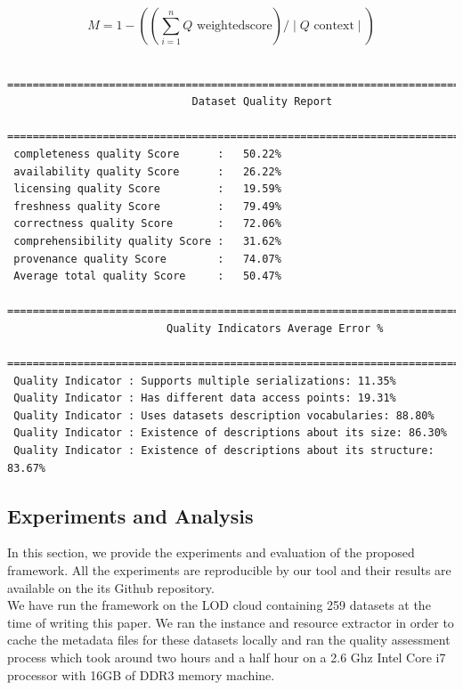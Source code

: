 \documentclass[onecolumn, crcready]{iosart2c}
\begin{document}
\begin{equation}
 M =  1 - ((\sum_{i=1}^{n} Q\textrm{ weightedscore}) / \mid Q\textrm{ context} \mid )
\end{equation}

\begin{lstlisting}
 =================================================================================
                             Dataset Quality Report
 =================================================================================
 completeness quality Score      :   50.22%
 availability quality Score      :   26.22%
 licensing quality Score         :   19.59%
 freshness quality Score         :   79.49%
 correctness quality Score       :   72.06%
 comprehensibility quality Score :   31.62%
 provenance quality Score        :   74.07%
 Average total quality Score     :   50.47%
 =================================================================================
                         Quality Indicators Average Error %
 =================================================================================
 Quality Indicator : Supports multiple serializations: 11.35%
 Quality Indicator : Has different data access points: 19.31%
 Quality Indicator : Uses datasets description vocabularies: 88.80%
 Quality Indicator : Existence of descriptions about its size: 86.30%
 Quality Indicator : Existence of descriptions about its structure: 83.67%
\end{lstlisting}

\subsection{Experiments and Analysis}

In this section, we provide the experiments and evaluation of the proposed framework. All the experiments are reproducible by our tool and their results are available on the its Github repository.\\
We have run the framework on the LOD cloud containing 259 datasets at the time of writing this paper. We ran the instance and resource extractor in order to cache the metadata files for these datasets locally and ran the quality assessment process which took around two hours and a half hour on a 2.6 Ghz Intel Core i7 processor with 16GB of DDR3 memory machine.\\
\end{document}
